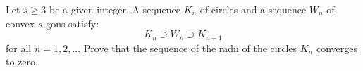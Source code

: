 Let $s \geq 3$ be a given integer. A sequence $K_n$ of circles and a sequence $W_n$
of convex $s$-gons satisfy:
\[ K_n \supset W_n \supset K_{n+1}  \] for all $n = 1, 2, ...$
Prove that the sequence of the radii of the circles $K_n$ converges to zero.